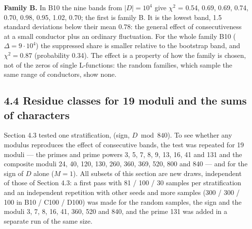 \documentclass[
  10pt,
]{article}
\begin{document}
\textbf{Family B.} In B10 the nine bands from \(|D| = 10^4\) give
\(\chi^2\) = 0.54, 0.69, 0.69, 0.74, 0.70, 0.98, 0.95, 1.02, 0.70; the
first is family B. It is the lowest band, 1.5 standard deviations below
their mean 0.78: the general effect of consecutiveness at a small
conductor plus an ordinary fluctuation. For the whole family B10
(\(\Delta = 9\cdot10^4\)) the suppressed share is smaller relative to
the bootstrap band, and \(\chi^2 = 0.87\) (probability 0.34). The effect
is a property of how the family is chosen, not of the zeros of single
L-functions: the random families, which sample the same range of
conductors, show none.

\hypertarget{residue-classes-for-19-moduli-and-the-sums-of-characters}{%
\subsection{4.4 Residue classes for 19 moduli and the sums of
characters}\label{residue-classes-for-19-moduli-and-the-sums-of-characters}}

Section 4.3 tested one stratification, (sign, \(D \bmod 840\)). To see
whether any modulus reproduces the effect of consecutive bands, the test
was repeated for 19 moduli --- the primes and prime powers 3, 5, 7, 8,
9, 13, 16, 41 and 131 and the composite moduli 24, 40, 120, 130, 260,
360, 369, 520, 800 and 840 --- and for the sign of \(D\) alone
(\(M = 1\)). All subsets of this section are new draws, independent of
those of Section 4.3: a first pass with 81 / 100 / 30 samples per
stratification and an independent repetition with other seeds and more
samples (300 / 300 / 100 in B10 / C100 / D100) was made for the random
samples, the sign and the moduli 3, 7, 8, 16, 41, 360, 520 and 840, and
the prime 131 was added in a separate run of the same size.
\end{document}
